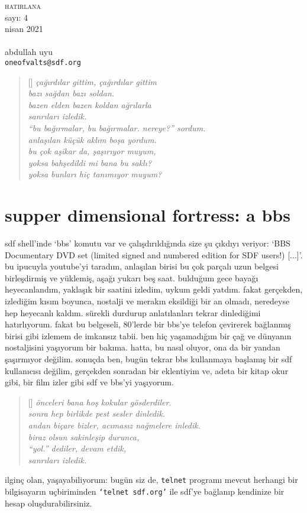 \documentclass[9pt, a5paper, twocolumn, openright]{memoir}
\begin{document}
\thispagestyle{plain}
\noindent
{\HUGE\textsc{hatirlana}\\\small{}sayı: 4\\nisan 2021}\\\\
{\small{}abdullah uyu\\\texttt{oneofvalts@sdf.org}}
\bigskip
{}
\begin{verse}[\versewidth]
  \itshape{}
  çağırdılar gittim, çağırdılar gittim\\
  bazı sağdan bazı soldan.\\
  bazen elden bazen koldan ağrılarla\\
  sanrıları izledik.\\
  ``bu bağırmalar, bu bağırmalar. nereye?'' sordum.\\
  anlaşılan küçük aklım boşa yordum.\\
  bu çok aşikar da, şaşırıyor muyum,\\
  yoksa bahşedildi mi bana bu saklı?\\
  yoksa bunları hiç tanımıyor muyum?\\
\end{verse}
\section{supper dimensional fortress: a bbs}
sdf shell'inde {\ttfamily `bbs'} komutu var ve çalışdırıldığında size şu
çıkdıyı veriyor: {\ttfamily `BBS  Documentary   DVD  set  (limited signed
  and  numbered edition  for SDF users!) [...]'}. bu ipucuyla youtube'yi
taradım, anlaşılan birisi bu çok parçalı uzun belgesi birleşdirmiş ve
yüklemiş, aşağı yukarı beş saat. bulduğum gece bayağı heyecanlandım,
yaklaşık bir saatini izledim, uykum geldi yatdım. fakat gerçekden,
izlediğim kısım boyunca, nostalji ve merakın eksildiği bir an olmadı,
neredeyse hep heyecanlı kaldım. sürekli durdurup anlatılanları tekrar
dinlediğimi hatırlıyorum. fakat bu belgeseli, 80'lerde bir bbs'ye telefon
çevirerek bağlanmış birisi gibi izlemem de imkansız tabii. ben hiç
yaşamadığım bir çağ ve dünyanın nostaljisini yaşıyorum bir bakıma.
hatta, bu nasıl oluyor, ona da bir yandan şaşırmıyor değilim. sonuçda
ben, bugün tekrar bbs kullanmaya başlamış bir sdf kullanıcısı değilim,
gerçekden sonradan bir eklentiyim ve, adeta bir kitap okur gibi, bir film
izler gibi sdf ve bbs'yi yaşıyorum.
\begin{verse}[\versewidth]
  \itshape{}
  önceleri bana hoş kokular gösderdiler.\\
  sonra hep birlikde pest sesler dinledik.\\
  andan biçare bizler, acımasız nağmelere inledik.\\
  biraz olsun sakinleşip durunca,\\
  ``yol.'' dediler, devam etdik,\\
  sanrıları izledik.\\
\end{verse}
ilginç olan, yaşayabiliyorum: bugün
siz de, \texttt{telnet} programı mevcut herhangi bir bilgisayarın
uçbiriminden \texttt{`telnet sdf.org'} ile sdf'ye bağlanıp kendinize bir
hesap oluşdurabilirsiniz.
\end{document}
